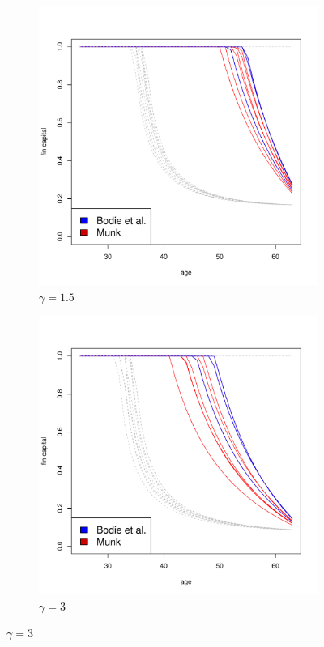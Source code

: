 \begin{figure}[h!]
	\centering
    \begin{subfigure}{0.45\textwidth}
		\centering
		\includegraphics[scale=0.3]{figs/individuals15.pdf}
		\caption{$\gamma = 1.5$}
	\end{subfigure}
	\hfill
    \begin{subfigure}{0.45\textwidth}
		\centering
		\includegraphics[scale=0.3]{figs/individuals3.pdf}
		\caption{$\gamma = 3$}
	\end{subfigure}
\end{figure}
